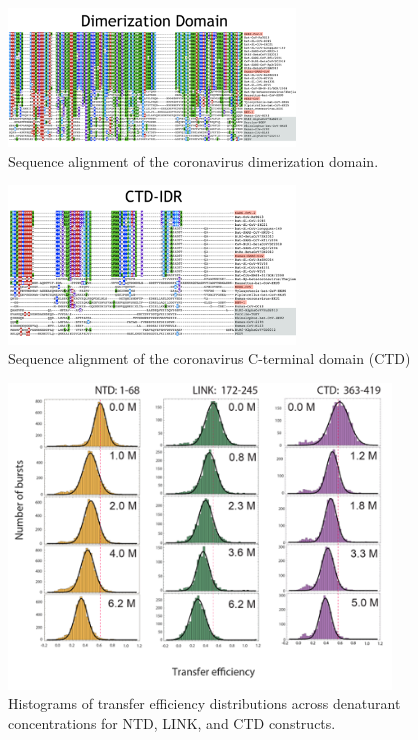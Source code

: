 \documentclass[../main.tex]{subfiles}
\begin{document}
        \begin{figure}[!htb] %
            \centering
            \includegraphics[width=3in]{appendix-e-fig4.png}
            \caption[Sequence alignment of the coronavirus dimerization domain.]
                {Sequence alignment of the coronavirus dimerization domain.}
            \label{fig:appendix-e-fig4}
        \end{figure}

        \begin{figure}[!htb] %
            \centering
            \includegraphics[width=3in]{appendix-e-fig5.png}
            \caption[Sequence alignment of the coronavirus C-terminal domain (CTD)]
                {Sequence alignment of the coronavirus C-terminal domain (CTD)}
            \label{fig:appendix-e-fig5}
        \end{figure}

        \begin{figure}[!htb] %
            \centering
            \includegraphics[width=4in]{appendix-e-fig6.png}
            \caption[Histograms of transfer efficiency distributions across denaturant concentrations for NTD, LINK, and CTD constructs.]
                {Histograms of transfer efficiency distributions across denaturant concentrations for NTD, LINK, and CTD constructs.}
            \label{fig:appendix-e-fig6}
        \end{figure}
\end{document}
